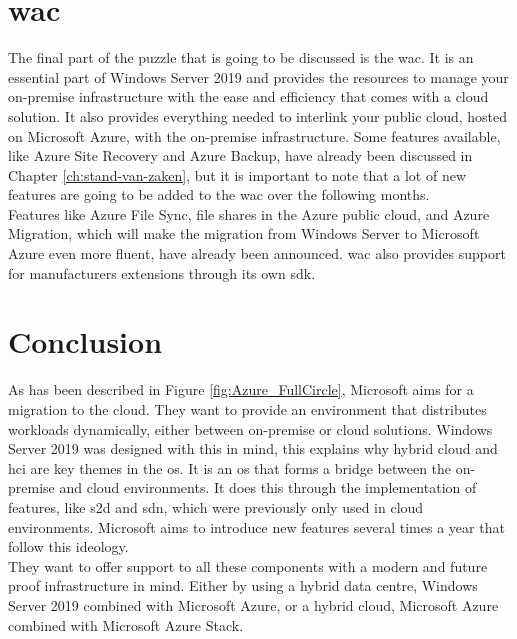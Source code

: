 \section{\acrfull{wac}}
The final part of the puzzle that is going to be discussed is the \acrlong{wac}. 
It is an essential part of Windows Server 2019 and provides the resources to manage your on-premise infrastructure with the ease and efficiency that comes with a cloud solution. 
It also provides everything needed to interlink your public cloud, hosted on Microsoft Azure, with the on-premise infrastructure. 
Some features available, like Azure Site Recovery and Azure Backup, have already been discussed in Chapter \ref{ch:stand-van-zaken}, but it is important to note that a lot of new features are going to be added to the \acrlong{wac} over the following months. \autocite{Singh2019} 
\\
Features like Azure File Sync, file shares in the Azure public cloud, and Azure Migration, which will make the migration from Windows Server to Microsoft Azure even more fluent, have already been announced. 
\acrlong{wac} also provides support for manufacturers extensions through its own \acrfull{sdk}. 	

\section{Conclusion}
As has been described in Figure \ref{fig:Azure_FullCircle}, Microsoft aims for a migration to the cloud. 
They want to provide an environment that distributes workloads dynamically, either between on-premise or cloud solutions. 
Windows Server 2019 was designed with this in mind, this explains why hybrid cloud and \acrshort{hci} are key themes in the \acrshort{os}. 
It is an \acrshort{os} that forms a bridge between the on-premise and cloud environments. 
It does this through the implementation of features, like \acrfull{s2d} and \acrfull{sdn}, which were previously only used in cloud environments. 
Microsoft aims to introduce new features several times a year that follow this ideology.
\\
They want to offer support to all these components with a modern and future proof infrastructure in mind. 
Either by using a hybrid data centre, Windows Server 2019 combined with Microsoft Azure, or a hybrid cloud, Microsoft Azure combined with Microsoft Azure Stack.